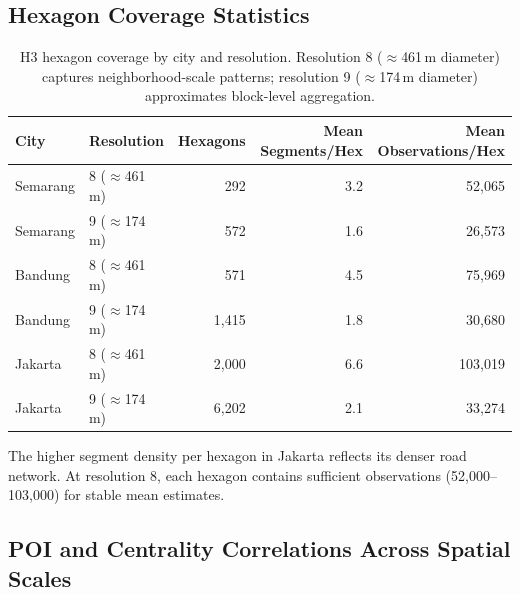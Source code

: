 \documentclass[preprint,12pt]{elsarticle}
\begin{document}
\subsection{Hexagon Coverage Statistics}

\begin{table}[!htbp]
\centering
\caption{H3 hexagon coverage by city and resolution. Resolution 8 ($\approx$461\,m diameter) captures neighborhood-scale patterns; resolution 9 ($\approx$174\,m diameter) approximates block-level aggregation.}
\label{tab:s4}
\begin{tabular}{llrrr}
\toprule
City & Resolution & Hexagons & Mean Segments/Hex & Mean Observations/Hex \\
\midrule
Semarang & 8 ($\approx$461\,m) & 292 & 3.2 & 52,065 \\
Semarang & 9 ($\approx$174\,m) & 572 & 1.6 & 26,573 \\
Bandung  & 8 ($\approx$461\,m) & 571 & 4.5 & 75,969 \\
Bandung  & 9 ($\approx$174\,m) & 1,415 & 1.8 & 30,680 \\
Jakarta  & 8 ($\approx$461\,m) & 2,000 & 6.6 & 103,019 \\
Jakarta  & 9 ($\approx$174\,m) & 6,202 & 2.1 & 33,274 \\
\bottomrule
\end{tabular}
\end{table}

The higher segment density per hexagon in Jakarta reflects its denser road network. At resolution 8, each hexagon contains sufficient observations (52,000--103,000) for stable mean estimates.

\subsection{POI and Centrality Correlations Across Spatial Scales}
\end{document}
